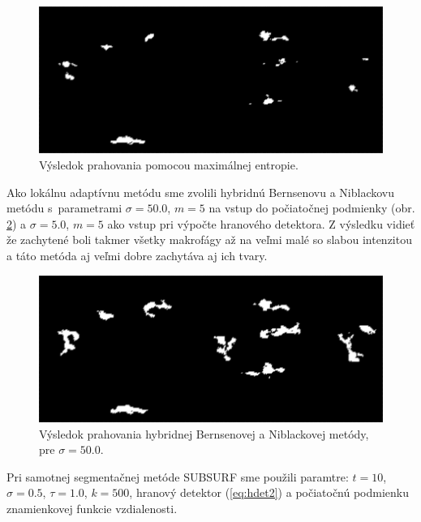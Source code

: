\documentclass[a4paper,11pt,oneside]{article}%
\begin{document}
\begin{figure}[H]
 \begin{center} 
 \includegraphics[scale=0.50]{pics/vysek_kapur.png}
\caption{Výsledok prahovania pomocou maximálnej entropie.}
\label{fig:vysek_kapur}
\end{center} 
\end{figure}

Ako lokálnu adaptívnu metódu sme zvolili hybridnú Bernsenovu a Niblackovu metódu s~parametrami $\sigma = 50.0$, $m = 5$ na vstup do počiatočnej podmienky (obr. \ref{fig:vysek_nb}) a $\sigma = 5.0$, $m = 5$ ako vstup pri výpočte hranového detektora. Z výsledku vidieť že zachytené boli takmer všetky makrofágy až na veľmi malé so slabou intenzitou a táto metóda aj veľmi dobre zachytáva aj ich tvary. 

\begin{figure}[H]
 \begin{center} 
 \includegraphics[scale=0.50]{pics/vysek_hybrid_nb.png}
\caption{Výsledok prahovania hybridnej Bernsenovej a Niblackovej metódy, pre $\sigma = 50.0$.}
\label{fig:vysek_nb}
\end{center} 
\end{figure}

Pri samotnej segmentačnej metóde SUBSURF sme použili paramtre: $t = 10$, $\sigma = 0.5$, $\tau = 1.0$, $k = 500$, hranový detektor (\ref{eq:hdet2}) a počiatočnú podmienku znamienkovej funkcie vzdialenosti.
\end{document}
